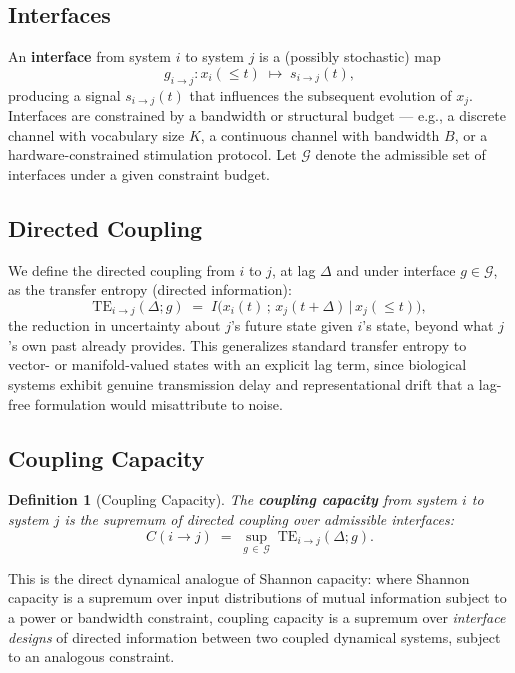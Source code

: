 \documentclass[11pt]{article}
\newtheorem{definitionbox}{Definition}
\begin{document}
\subsection{Interfaces}

An \textbf{interface} from system $i$ to system $j$ is a (possibly stochastic) map
\[
g_{i \to j} : x_i(\leq t) \;\longmapsto\; s_{i \to j}(t),
\]
producing a signal $s_{i \to j}(t)$ that influences the subsequent evolution of $x_j$. Interfaces are constrained by a bandwidth or structural budget --- e.g., a discrete channel with vocabulary size $K$, a continuous channel with bandwidth $B$, or a hardware-constrained stimulation protocol. Let $\mathcal{G}$ denote the admissible set of interfaces under a given constraint budget.

\subsection{Directed Coupling}

We define the directed coupling from $i$ to $j$, at lag $\Delta$ and under interface $g \in \mathcal{G}$, as the transfer entropy (directed information):
\begin{equation}
\mathrm{TE}_{i \to j}(\Delta; g) \;=\; I\big(x_i(t)\, ;\, x_j(t+\Delta) \,\big|\, x_j(\leq t)\big),
\end{equation}
the reduction in uncertainty about $j$'s future state given $i$'s state, beyond what $j$'s own past already provides. This generalizes standard transfer entropy to vector- or manifold-valued states with an explicit lag term, since biological systems exhibit genuine transmission delay and representational drift that a lag-free formulation would misattribute to noise.

\subsection{Coupling Capacity}

\begin{definitionbox}[Coupling Capacity]
The \textbf{coupling capacity} from system $i$ to system $j$ is the supremum of directed coupling over admissible interfaces:
\begin{equation}
C(i \to j) \;=\; \sup_{g \,\in\, \mathcal{G}} \; \mathrm{TE}_{i \to j}(\Delta; g).
\end{equation}
\end{definitionbox}

\noindent This is the direct dynamical analogue of Shannon capacity: where Shannon capacity is a supremum over input distributions of mutual information subject to a power or bandwidth constraint, coupling capacity is a supremum over \emph{interface designs} of directed information between two coupled dynamical systems, subject to an analogous constraint.
\end{document}
